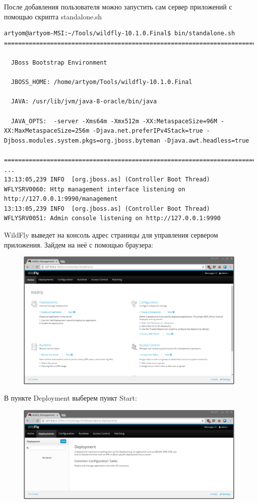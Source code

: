 После добавления пользователя можно запустить сам сервер приложений с помощью скрипта standalone.sh

\begin{lstlisting}
artyom@artyom-MSI:~/Tools/wildfly-10.1.0.Final$ bin/standalone.sh
=========================================================================

  JBoss Bootstrap Environment

  JBOSS_HOME: /home/artyom/Tools/wildfly-10.1.0.Final

  JAVA: /usr/lib/jvm/java-8-oracle/bin/java

  JAVA_OPTS:  -server -Xms64m -Xmx512m -XX:MetaspaceSize=96M -XX:MaxMetaspaceSize=256m -Djava.net.preferIPv4Stack=true -Djboss.modules.system.pkgs=org.jboss.byteman -Djava.awt.headless=true

=========================================================================
...
13:13:05,239 INFO  [org.jboss.as] (Controller Boot Thread) WFLYSRV0060: Http management interface listening on http://127.0.0.1:9990/management
13:13:05,239 INFO  [org.jboss.as] (Controller Boot Thread) WFLYSRV0051: Admin console listening on http://127.0.0.1:9990
\end{lstlisting}

WildFly выведет на консоль адрес страницы для управления сервером приложения. Зайдем на неё с помощью браузера:

\begin{figure}[H]
\centering
\includegraphics[width=\textwidth]{wildfly.png}
\caption{}
\end{figure}

В пункте Deployment выберем пункт Start:

\begin{figure}[H]
\centering
\includegraphics[width=\textwidth]{wildfly2.png}
\caption{}
\end{figure}

